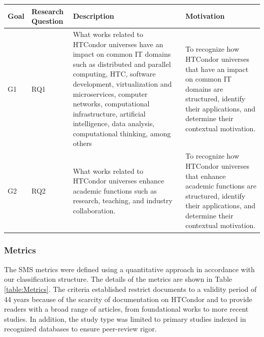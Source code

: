\begin{table}
	{\begin{tabular}{p{0.5cm}p{1.4cm}p{6.0cm}p{4.5cm}} \toprule
			\textbf{Goal} & \textbf{Research Question} & \textbf{Description}                                                                                                                                                                                                                                                                                                & \textbf{Motivation}                                                                                                                                                  \\
			\midrule
			G1            & RQ1                        & What works related to HTCondor universes have an impact on common IT domains such as distributed and parallel computing, HTC, software development, virtualization and microservices, computer networks, computational infrastructure, artificial intelligence, data analysis, computational thinking, among others & To recognize how HTCondor universes that have an impact on common IT domains are structured, identify their applications, and determine their contextual motivation. \\
			G2            & RQ2                        & What works related to HTCondor universes enhance academic functions such as research, teaching, and industry collaboration.                                                                                                                                                                                         & To recognize how HTCondor universes that enhance academic functions are structured, identify their applications, and determine their contextual motivation.          \\
			\bottomrule
		\end{tabular}}
	\label{table:RQs}
\end{table}

\subsubsection{Metrics}
The SMS metrics were defined using a quantitative approach in accordance with our classification structure. The details of the metrics are shown in Table \ref{table:Metrics}. The criteria established restrict documents to a validity period of 44 years because of the scarcity of documentation on HTCondor and to provide readers with a broad range of articles, from foundational works to more recent studies. In addition, the study type was limited to primary studies indexed in recognized databases to ensure peer-review rigor.

